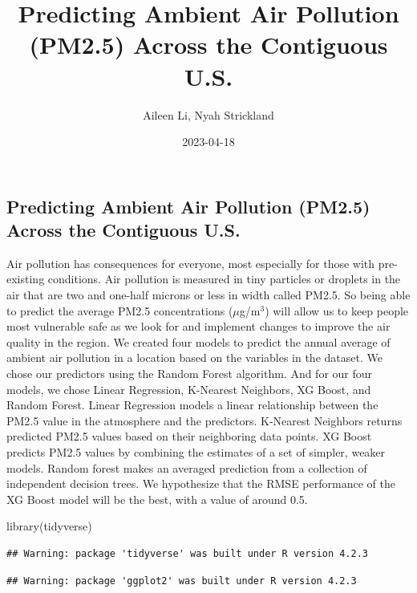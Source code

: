 \documentclass[
]{article}
\title{Predicting Ambient Air Pollution (PM2.5) Across the Contiguous
U.S.}
\author{Aileen Li, Nyah Strickland}
\date{2023-04-18}
\newenvironment{Shaded}{\begin{snugshade}}{\end{snugshade}}
\newcommand{\FunctionTok}[1]{\textcolor[rgb]{0.00,0.00,0.00}{#1}}
\newcommand{\NormalTok}[1]{#1}
\begin{document}
\maketitle

\hypertarget{predicting-ambient-air-pollution-pm2.5-across-the-contiguous-u.s.}{%
\subsection{Predicting Ambient Air Pollution (PM2.5) Across the
Contiguous
U.S.}\label{predicting-ambient-air-pollution-pm2.5-across-the-contiguous-u.s.}}

Air pollution has consequences for everyone, most especially for those
with pre-existing conditions. Air pollution is measured in tiny
particles or droplets in the air that are two and one-half microns or
less in width called PM2.5. So being able to predict the average PM2.5
concentrations (\(\mu\)g/m\(^3\)) will allow us to keep people most
vulnerable safe as we look for and implement changes to improve the air
quality in the region. We created four models to predict the annual
average of ambient air pollution in a location based on the variables in
the dataset. We chose our predictors using the Random Forest algorithm.
And for our four models, we chose Linear Regression, K-Nearest
Neighbors, XG Boost, and Random Forest. Linear Regression models a
linear relationship between the PM2.5 value in the atmosphere and the
predictors. K-Nearest Neighbors returns predicted PM2.5 values based on
their neighboring data points. XG Boost predicts PM2.5 values by
combining the estimates of a set of simpler, weaker models. Random
forest makes an averaged prediction from a collection of independent
decision trees. We hypothesize that the RMSE performance of the XG Boost
model will be the best, with a value of around 0.5.

\begin{Shaded}
\begin{Highlighting}[]
\FunctionTok{library}\NormalTok{(tidyverse)}
\end{Highlighting}
\end{Shaded}

\begin{verbatim}
## Warning: package 'tidyverse' was built under R version 4.2.3
\end{verbatim}

\begin{verbatim}
## Warning: package 'ggplot2' was built under R version 4.2.3
\end{verbatim}
\end{document}
